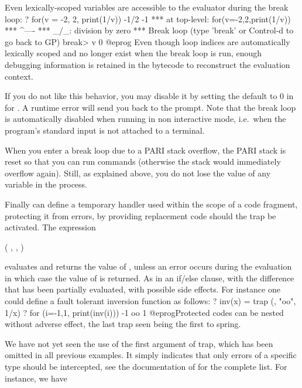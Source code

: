 Even lexically-scoped variables are accessible to the evaluator during the
break loop:
\bprog
? for(v = -2, 2, print(1/v))
-1/2
-1
  ***   at top-level: for(v=-2,2,print(1/v))
  ***                                   ^----
  *** _/_: division by zero
  ***   Break loop (type 'break' or Control-d to go back to GP)
break> v
0
@eprog\noindent
Even though loop indices are automatically lexically scoped and no longer
exist when the break loop is run, enough debugging information is retained in
the bytecode to reconstruct the evaluation context.

 If you do not like this behavior, you may disable it by
setting the default  to 0 in for . A runtime error
will send you back to the prompt. Note that the break loop is automatically
disabled when running  in non interactive mode, i.e.~when the
program's standard input is not attached to a terminal.

 When you enter a break loop due to a PARI stack
overflow, the PARI stack is reset so that you can run commands (otherwise the
stack would immediately overflow again). Still, as explained above, you do
not lose the value of any  variable in the process.

 Finally  can define a temporary handler
used within the scope of a code fragment, protecting it from errors, by
providing replacement code should the trap be activated. The expression

  ( , , )

\noindent evaluates and returns the value of , unless an
error occurs during the evaluation in which case the value of 
is returned. As in an if/else clause, with the difference that
 has been partially evaluated, with possible side effects.
For instance one could define a fault tolerant inversion function as follows:
\bprog
? inv(x) = trap (, "oo", 1/x)
? for (i=-1,1, print(inv(i)))
-1
oo
1
@eprog\noindent Protected codes can be nested without adverse effect, the
last trap seen being the first to spring.

 We have not yet seen the use of the
first argument of trap, which has been omitted in all previous examples. It
simply indicates that only errors of a specific type should be intercepted,
see the documentation of  for the complete list. For instance, we
have

